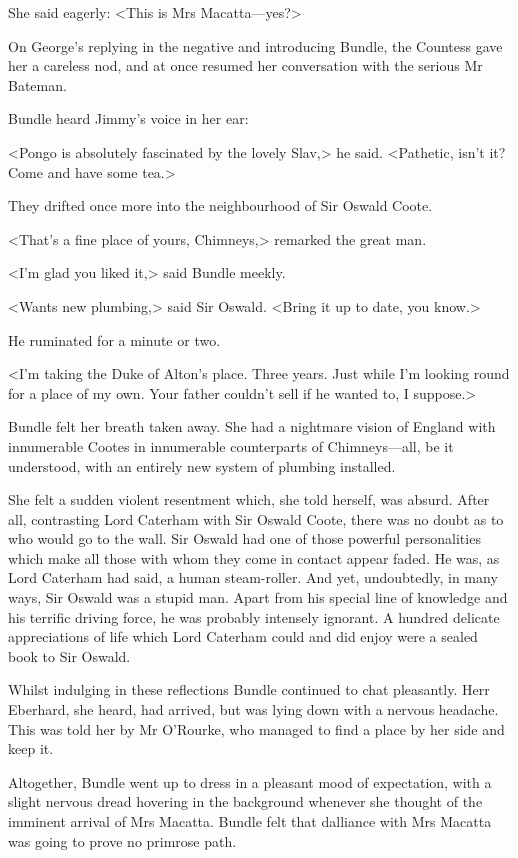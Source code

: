 She said eagerly: <This is Mrs Macatta—yes?>

On George's replying in the negative and introducing Bundle, the Countess gave her a careless nod, and at once resumed her conversation with the serious Mr Bateman.

Bundle heard Jimmy's voice in her ear:

<Pongo is absolutely fascinated by the lovely Slav,> he said. <Pathetic, isn't it? Come and have some tea.>

They drifted once more into the neighbourhood of Sir Oswald Coote.

<That's a fine place of yours, Chimneys,> remarked the great man.

<I'm glad you liked it,> said Bundle meekly.

<Wants new plumbing,> said Sir Oswald. <Bring it up to date, you know.>

He ruminated for a minute or two.

<I'm taking the Duke of Alton's place. Three years. Just while I'm looking round for a place of my own. Your father couldn't sell if he wanted to, I suppose.>

Bundle felt her breath taken away. She had a nightmare vision of England with innumerable Cootes in innumerable counterparts of Chimneys—all, be it understood, with an entirely new system of plumbing installed.

She felt a sudden violent resentment which, she told herself, was absurd. After all, contrasting Lord Caterham with Sir Oswald Coote, there was no doubt as to who would go to the wall. Sir Oswald had one of those powerful personalities which make all those with whom they come in contact appear faded. He was, as Lord Caterham had said, a human steam-roller. And yet, undoubtedly, in many ways, Sir Oswald was a stupid man. Apart from his special line of knowledge and his terrific driving force, he was probably intensely ignorant. A hundred delicate appreciations of life which Lord Caterham could and did enjoy were a sealed book to Sir Oswald.

Whilst indulging in these reflections Bundle continued to chat pleasantly. Herr Eberhard, she heard, had arrived, but was lying down with a nervous headache. This was told her by Mr O'Rourke, who managed to find a place by her side and keep it.

Altogether, Bundle went up to dress in a pleasant mood of expectation, with a slight nervous dread hovering in the background whenever she thought of the imminent arrival of Mrs Macatta. Bundle felt that dalliance with Mrs Macatta was going to prove no primrose path.

